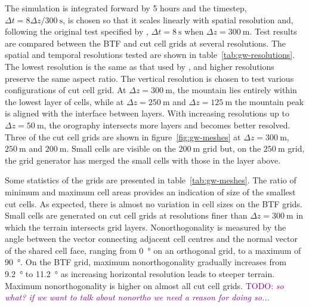 \documentclass{ametsoc}
\newcommand{\TODO}[1]{\textcolor{purple}{TODO: \emph{#1}}}
\begin{document}
The simulation is integrated forward by 5 hours and the timestep, $\Delta t = 8 \Delta z / \SI{300}{\second}$, is chosen so that it scales linearly with spatial resolution and, following the original test specified by \citet{schaer2002}, $\Delta t = \SI{8}{\second}$ when $\Delta z = \SI{300}{\meter}$.
Test results are compared between the BTF and cut cell grids at several resolutions.
The spatial and temporal resolutions tested are shown in table~\ref{tab:gw-resolutions}.  The lowest resolution is the same as that used by \citet{schaer2002}, and higher resolutions preserve the same aspect ratio.
The vertical resolution is chosen to test various configurations of cut cell grid.  At $\Delta z = \SI{300}{\meter}$, the mountain lies entirely within the lowest layer of cells, while at $\Delta z = \SI{250}{\meter}$ and $\Delta z = \SI{125}{\meter}$ the mountain peak is aligned with the interface between layers.  With increasing resolutions up to $\Delta z = \SI{50}{\meter}$, the orography intersects more layers and becomes better resolved.  Three of the cut cell grids are shown in figure~\ref{fig:gw-meshes} at $\Delta z = \SI{300}{\meter}$, $\SI{250}{\meter}$ and $\SI{200}{\meter}$.  Small cells are visible on the $\SI{200}{\meter}$ grid but, on the $\SI{250}{\meter}$ grid, the grid generator has merged the small cells with those in the layer above.

Some statistics of the grids are presented in table~\ref{tab:gw-meshes}.  The ratio of minimum and maximum cell areas provides an indication of size of the smallest cut cells.  As expected, there is almost no variation in cell sizes on the BTF grids.  Small cells are generated on cut cell grids at resolutions finer than $\Delta z = \SI{300}{\meter}$ in which the terrain intersects grid layers.  Nonorthogonality is measured by the angle between the vector connecting adjacent cell centres and the normal vector of the shared cell face, ranging from \SI{0}{\degree} on an orthogonal grid, to a maximum of \SI{90}{\degree}.  On the BTF grid, maximum nonorthogonality gradually increases from \SI{9.2}{\degree} to \SI{11.2}{\degree} as increasing horizontal resolution leads to steeper terrain.  Maximum nonorthogonality is higher on almost all cut cell grids.  \TODO{so what?  if we want to talk about nonortho we need a reason for doing so...}
\end{document}
